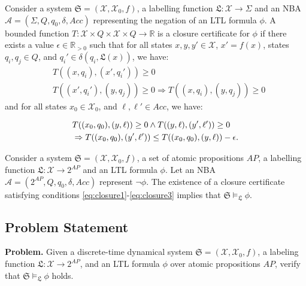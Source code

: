 \begin{definition}
\label{LTLCC}
Consider a system $\mathfrak{S} = (\mathcal{X}, \mathcal{X}_0, f)$, a labelling function $\mathfrak{L} : \mathcal{X} \rightarrow \Sigma$ and an NBA $\mathcal{A} = (\Sigma, Q, q_0, \delta, Acc)$ representing the negation of an LTL formula $\phi$. A bounded function $T : \mathcal{X} \times Q \times \mathcal{X} \times Q \rightarrow \mathbb{R}$ is a closure certificate for $\phi$ if there exists a value $\epsilon \in \mathbb{R}_{> 0}$ such that for all states $x, y, y' \in \mathcal{X}$, $x' = f(x)$, states $q_i, q_j \in Q$, and $q_i' \in \delta(q_i, \mathfrak{L}(x))$, we have:
\begin{align}
    &T((x, q_i), (x', q_i')) \geq 0 \label{eq:closure1} \\
    &T((x', q_i'), (y, q_j)) \geq 0 \Rightarrow T((x, q_i), (y, q_j)) \geq 0 \label{eq:closure2}
\end{align}
and for all states $x_0 \in \mathcal{X}_0$, and $\ell, \ell' \in Acc$, we have:

\begin{align}
  & T((x_0, q_0), (y, \ell)) \geq 0 \land T((y, \ell), (y', \ell')) \geq 0 \notag \\
  &\Rightarrow T((x_0, q_0), (y', \ell')) \leq T((x_0, q_0), (y, \ell)) - \epsilon. \label{eq:closure3}
\end{align}
\end{definition}

\begin{theorem}[LTL]
Consider a system $\mathfrak{S}=(\mathcal{X}, \mathcal{X}_0, f)$, a set of atomic propositions $AP$, a labelling function $\mathfrak{L}: \mathcal{X} \rightarrow 2^{AP}$ and an LTL formula $\phi$. Let an NBA $\mathcal{A} = (2^{AP}, Q, q_0, \delta, Acc)$ represent $\neg \phi$. The existence of a closure certificate satisfying conditions \eqref{eq:closure1}-\eqref{eq:closure3} implies that $\mathfrak{S} \models_\mathfrak{L} \phi$.
\end{theorem}

\subsection{Problem Statement}
\textbf{Problem.} Given a discrete-time dynamical system $\mathfrak{S} = (\mathcal{X}, \mathcal{X}_0, f)$, a labeling function $\mathfrak{L}: \mathcal{X} \rightarrow 2^{AP}$, and an LTL formula $\phi$ over atomic propositions $AP$, verify that $\mathfrak{S} \models_{\mathfrak{L}} \phi$ holds.
